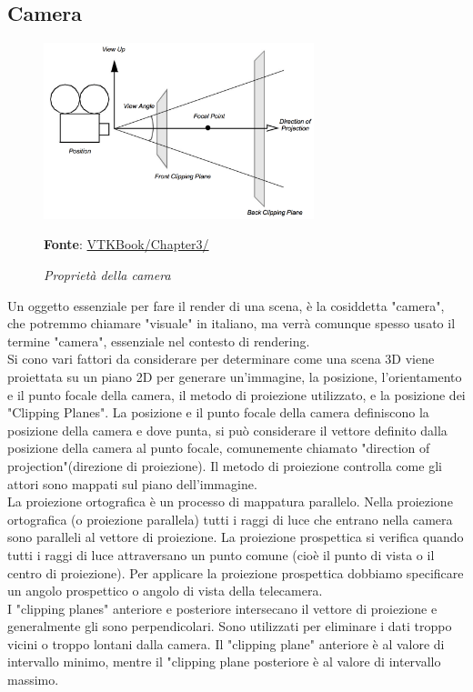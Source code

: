 \subsection{Camera}
\begin{figure}[h]
    \centering
    \includegraphics[width=0.7\textwidth]{immagini/volumerendering/camera.png}
    \caption{\textit{Proprietà della camera}}
    \textbf{Fonte}: \href{https://lorensen.github.io/VTKExamples/site/VTKBook/03Chapter3/}{VTKBook/Chapter3/}
    \label{fig: Proprietà Camera}
\end{figure}

Un oggetto essenziale per fare il render di una scena, è la cosiddetta "camera", che potremmo chiamare "visuale" in italiano, ma verrà comunque spesso usato il termine "camera", essenziale nel contesto di rendering.\\
Si cono vari fattori da considerare per determinare come una scena 3D viene proiettata su un piano 2D per generare un'immagine, la posizione, l'orientamento e il punto focale della camera, il metodo di proiezione utilizzato, e la posizione dei "Clipping Planes". La posizione e il punto focale della camera definiscono la posizione della camera e dove punta, si può considerare il vettore definito dalla posizione della camera al punto focale, comunemente chiamato "direction of projection"(direzione di proiezione). Il metodo di proiezione controlla come gli attori sono mappati sul piano dell'immagine.
\\
La proiezione ortografica è un processo di mappatura parallelo. Nella proiezione ortografica (o proiezione parallela) tutti i raggi di luce che entrano nella camera sono paralleli al vettore di proiezione. La proiezione prospettica si verifica quando tutti i raggi di luce attraversano un punto comune (cioè il punto di vista o il centro di proiezione). Per applicare la proiezione prospettica dobbiamo specificare un angolo prospettico o angolo di vista della telecamera.
\\
I "clipping planes" anteriore e posteriore intersecano il vettore di proiezione e generalmente gli sono perpendicolari. Sono utilizzati per eliminare i dati troppo vicini o troppo lontani dalla camera. Il "clipping plane" anteriore è al valore di intervallo minimo, mentre il "clipping plane posteriore è al valore di intervallo massimo.

